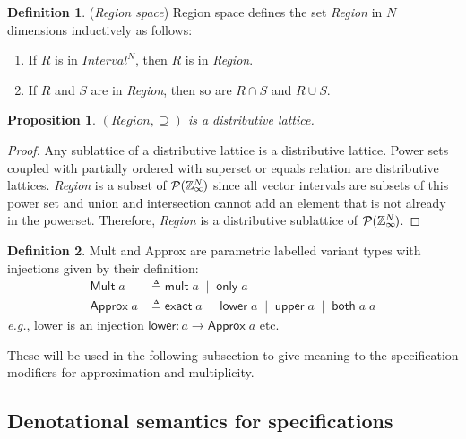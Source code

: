 \documentclass{article}
\theoremstyle{definition}
\newtheorem{defn}{Definition}
\theoremstyle{plain}
\newtheorem{prop}{Proposition}
\newcommand{\eg}{\emph{e.g.}}
\newcommand{\zinf}{\textnormal{$\mathbb{Z}_\infty$}}
\begin{document}
\begin{defn}{(\emph{Region space})}
  Region space defines the set \textit{Region} in $N$ dimensions inductively as
  follows:
%
  \begin{enumerate}
    \item If $R$ is in $\textit{Interval}^N$, then $R$ is in \textit{Region}.
    \item If $R$ and $S$ are in \textit{Region}, then so are $R \cap S$ and $R
      \cup S$.
  \end{enumerate}
\end{defn}

\begin{prop}{}
  $(\textit{Region},\supseteq)$ is a distributive lattice.
\end{prop}
%
\begin{proof}
  Any sublattice of a distributive lattice is a distributive lattice. Power sets
  coupled with partially ordered with superset or equals relation are
  distributive lattices. \textit{Region} is a subset of
  $\mathcal{P}{(\zinf{}^{\mkern-19mu{N}})}$ since all vector intervals are
  subsets of this power set and union and intersection cannot add an element
  that is not already in the powerset. Therefore, \textit{Region} is a
  distributive sublattice of $\mathcal{P}{(\zinf{}^{\mkern-19mu{N}})}$.
\end{proof}

\begin{defn}{}
  \textsf{Mult} and \textsf{Approx} are parametric labelled variant types with
  injections given by their definition:
%
  \begin{align*}
    \textsf{Mult} \; a &
      \triangleq \textsf{mult} \; a \;\mid\; \textsf{only} \; a \\
    \textsf{Approx} \; a &
      \triangleq \textsf{exact} \; a \;\mid\; \textsf{lower} \; a \;\mid\;
        \textsf{upper} \; a \;\mid\; \textsf{both} \; a \; a
  \end{align*}
%
  \eg{}, \textsf{lower} is an injection $\mathsf{lower} : a \to \mathsf{Approx}
  \; a$ etc.

  These will be used in the following subsection to give meaning to the
  specification modifiers for approximation and multiplicity.
\end{defn}

\subsection{Denotational semantics for specifications}
\end{document}
